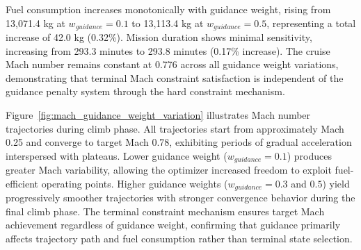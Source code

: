 Fuel consumption increases monotonically with guidance weight, rising from 13,071.4 kg at $w_{guidance} = 0.1$ to 13,113.4 kg at $w_{guidance} = 0.5$, representing a total increase of 42.0 kg (0.32\%). Mission duration shows minimal sensitivity, increasing from 293.3 minutes to 293.8 minutes (0.17\% increase). The cruise Mach number remains constant at 0.776 across all guidance weight variations, demonstrating that terminal Mach constraint satisfaction is independent of the guidance penalty system through the hard constraint mechanism.

Figure~\ref{fig:mach_guidance_weight_variation} illustrates Mach number trajectories during climb phase. All trajectories start from approximately Mach 0.25 and converge to target Mach 0.78, exhibiting periods of gradual acceleration interspersed with plateaus. Lower guidance weight ($w_{guidance} = 0.1$) produces greater Mach variability, allowing the optimizer increased freedom to exploit fuel-efficient operating points. Higher guidance weights ($w_{guidance} = 0.3$ and $0.5$) yield progressively smoother trajectories with stronger convergence behavior during the final climb phase. The terminal constraint mechanism ensures target Mach achievement regardless of guidance weight, confirming that guidance primarily affects trajectory path and fuel consumption rather than terminal state selection.
